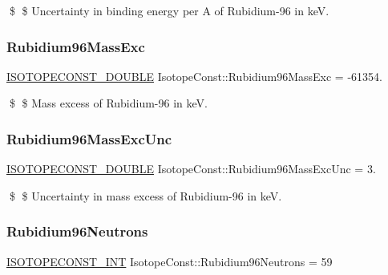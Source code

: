\$ \$ Uncertainty in binding energy per A of Rubidium-\/96 in keV. \mbox{\label{group___isotope_const-_rubidium-_rb96_ga334fdcd2fd17a5af64eeaa0f69a79346}} 
\subsubsection{\texorpdfstring{Rubidium96\+Mass\+Exc}{Rubidium96MassExc}}
{\footnotesize\ttfamily \mbox{\hyperlink{group___isotope_const-_macros_ga8f45a7272ce02c0b4c65c44636ed719a}{I\+S\+O\+T\+O\+P\+E\+C\+O\+N\+S\+T\+\_\+\+D\+O\+U\+B\+LE}} Isotope\+Const\+::\+Rubidium96\+Mass\+Exc = -\/61354.}

\$ \$ Mass excess of Rubidium-\/96 in keV. \mbox{\label{group___isotope_const-_rubidium-_rb96_ga2f674995046a0903bbb2c670170a4021}} 
\subsubsection{\texorpdfstring{Rubidium96\+Mass\+Exc\+Unc}{Rubidium96MassExcUnc}}
{\footnotesize\ttfamily \mbox{\hyperlink{group___isotope_const-_macros_ga8f45a7272ce02c0b4c65c44636ed719a}{I\+S\+O\+T\+O\+P\+E\+C\+O\+N\+S\+T\+\_\+\+D\+O\+U\+B\+LE}} Isotope\+Const\+::\+Rubidium96\+Mass\+Exc\+Unc = 3.}

\$ \$ Uncertainty in mass excess of Rubidium-\/96 in keV. \mbox{\label{group___isotope_const-_rubidium-_rb96_ga6d89f5052f10c9f831ee42ba255891f8}} 
\subsubsection{\texorpdfstring{Rubidium96\+Neutrons}{Rubidium96Neutrons}}
{\footnotesize\ttfamily \mbox{\hyperlink{group___isotope_const-_macros_ga5f18360b3e99483a35c32d789e62621c}{I\+S\+O\+T\+O\+P\+E\+C\+O\+N\+S\+T\+\_\+\+I\+NT}} Isotope\+Const\+::\+Rubidium96\+Neutrons = 59}

